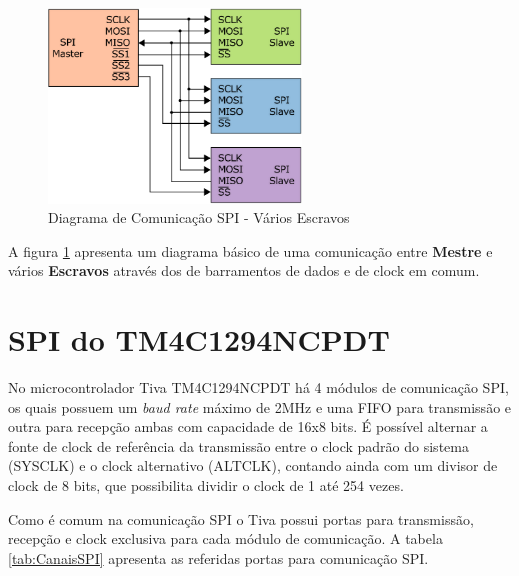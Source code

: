 \begin{figure}[H]
	\centering
	\includegraphics[width=0.6\textwidth] {figuras/BarramentoSPI.eps}
	\caption{Diagrama de Comunicação SPI - Vários Escravos}
	\label{fig:SPIDiagrama}
\end{figure}

A figura  \ref{fig:SPIDiagrama} apresenta um diagrama básico de uma comunicação entre \textbf{Mestre} e vários \textbf{Escravos} através dos de barramentos de dados e de clock em comum.  

\section{SPI do TM4C1294NCPDT}

No microcontrolador Tiva TM4C1294NCPDT há 4 módulos de comunicação SPI, os quais possuem um \emph{baud rate} máximo de 2MHz e uma FIFO para transmissão e outra para recepção ambas com capacidade de 16x8 bits. É possível alternar a fonte de clock de referência da transmissão entre o clock padrão do sistema (SYSCLK) e o clock alternativo (ALTCLK), contando ainda com um divisor de clock de 8 bits, que possibilita dividir o clock de 1 até 254 vezes.  

Como é comum na comunicação SPI o Tiva possui portas para transmissão, recepção e clock exclusiva para cada  módulo de comunicação. A tabela \ref{tab:CanaisSPI} apresenta as referidas portas para comunicação SPI.

